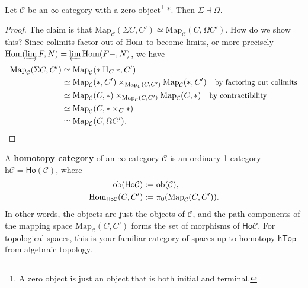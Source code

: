 \begin{claim}
    Let $\mathcal{C} $ be an $\infty$-category with a zero object\footnote{A zero object is just an object that is both initial and terminal.} $*$. Then $\Sigma \dashv \Omega$.
\end{claim}
\begin{proof}
    The claim is that $\mathrm{Map}_{\mathcal{C} }(\Sigma C, C')\simeq \mathrm{Map}_{\mathcal{C} }(C,\Omega C')$. How do we show this? Since colimits factor out of $\operatorname{Hom}$ to become limits, or more precisely $\operatorname{Hom}(\varinjlim F, N)=\varprojlim \operatorname{Hom}(F-,N) $, we have
    \begin{align*}
        \mathrm{Map}_{\mathcal{C} }(\Sigma C,C')&\simeq \mathrm{Map}_{\mathcal{C} }(*\amalg_C *, C')\\
                                                &\simeq \mathrm{Map}_{\mathcal{C} }(* , C') \times _{\mathrm{Map}_{\mathcal{C} }(C,C')} \mathrm{Map}_{\mathcal{C} }(*, C') \quad \text{\small by factoring out colimits} \\
                                                &\simeq \mathrm{Map}_{\mathcal{C} }(C,*) \times_{\mathrm{Map}_{\mathcal{C} }(C,C')}\mathrm{Map}_{\mathcal{C} }(C,*) \quad \text{\small by contractibility} \\
                                                &\simeq \mathrm{Map}_{\mathcal{C} }(C , * \times _C *) \\
                                                &\simeq \mathrm{Map}_{\mathcal{C} }(C,\Omega C').\qedhere
    \end{align*}
\end{proof}

\begin{definition}[]
    A \textbf{homotopy category} of an $\infty$-category $\mathcal{C} $ is an ordinary 1-category $\mathrm{h} \mathcal{C} =\mathsf{Ho}(\mathcal{C})  $, where 
    \begin{align*}
        \mathrm{ob}(\mathsf{Ho} \mathcal{C} )&:= \mathrm{ob}(\mathcal{C} ),\\
        \operatorname{Hom} _{ \mathsf{Ho} \mathcal{C} }(C,C')&:= \pi_0 (\mathrm{Map}_{\mathcal{C} }(C,C')).
    \end{align*}In other words, the objects are just the objects of $\mathcal{C} $, and the path components of the mapping space $\mathrm{Map}_{\mathcal{C} }(C,C')$ forms the set of morphisms of $\mathsf{Ho} \mathcal{C} $. For topological spaces, this is your familiar category of spaces up to homotopy $\mathsf{hTop} $ from algebraic topology.
\end{definition}

